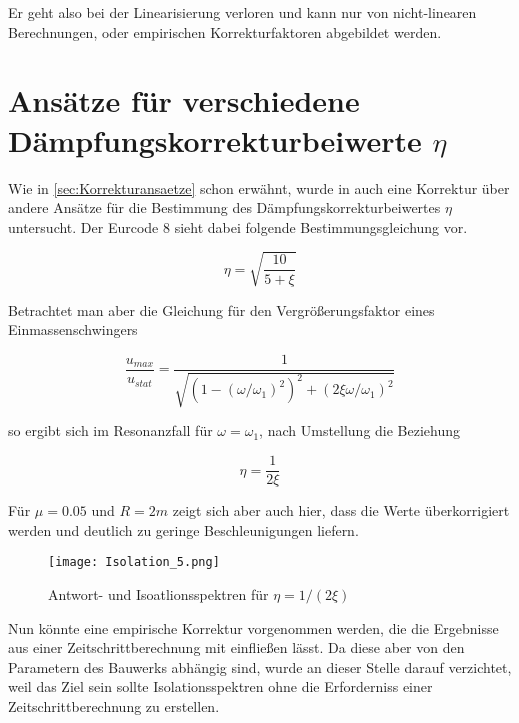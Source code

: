 Er geht also bei der Linearisierung verloren und kann nur von nicht-linearen Berechnungen, oder empirischen Korrekturfaktoren abgebildet werden.

\pagebreak

\section{Ansätze für verschiedene Dämpfungskorrekturbeiwerte $\eta$}

Wie in \cref{sec:Korrekturansaetze} schon erwähnt, wurde in \cite{Isemann} auch eine Korrektur über andere Ansätze für die Bestimmung des Dämpfungskorrekturbeiwertes $\eta$ untersucht.
Der Eurcode 8 sieht dabei folgende Bestimmungsgleichung vor.

\begin{equation*}
\eta = \sqrt{\frac{10}{5+\xi}}
\end{equation*}

Betrachtet man aber die Gleichung für den Vergrößerungsfaktor eines Einmassenschwingers

\begin{equation}
\frac{u_{max}}{u_{stat}} = \frac{1}{\sqrt{(1 - (\omega / \omega_1)^2)^2 + (2 \xi \omega / \omega_1)^2}}
\end{equation}

so ergibt sich im Resonanzfall für $\omega = \omega_1$, nach Umstellung die Beziehung

\begin{equation}
\eta = \frac{1}{2\xi}
\end{equation}

Für $\mu = 0.05$ und $R = 2 m$ zeigt sich aber auch hier, dass die Werte überkorrigiert werden und deutlich zu geringe Beschleunigungen liefern.

\begin{figure}[H]
    \centering
    \texttt{[image: Isolation\_5.png]}
    \caption{Antwort- und Isoatlionsspektren für $\eta = 1/(2\xi)$}
    \label{fig:Isolation5}
\end{figure}

Nun könnte eine empirische Korrektur vorgenommen werden, die die Ergebnisse aus einer Zeitschrittberechnung mit einfließen lässt. Da diese aber von den Parametern des Bauwerks abhängig sind, wurde an dieser Stelle darauf verzichtet, weil das Ziel sein sollte Isolationsspektren ohne die Erforderniss einer Zeitschrittberechnung zu erstellen.

\pagebreak